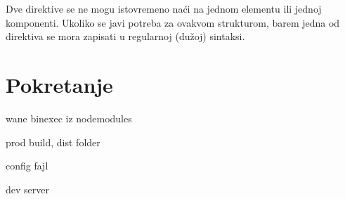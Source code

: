 Dve direktive se ne mogu istovremeno naći na jednom elementu ili jednoj komponenti.
Ukoliko se javi potreba za ovakvom strukturom, barem jedna od direktiva se mora zapisati u regularnoj (dužoj) sintaksi.

\section{Pokretanje}

wane binexec iz nodemodules

prod build, dist folder

config fajl

dev server
